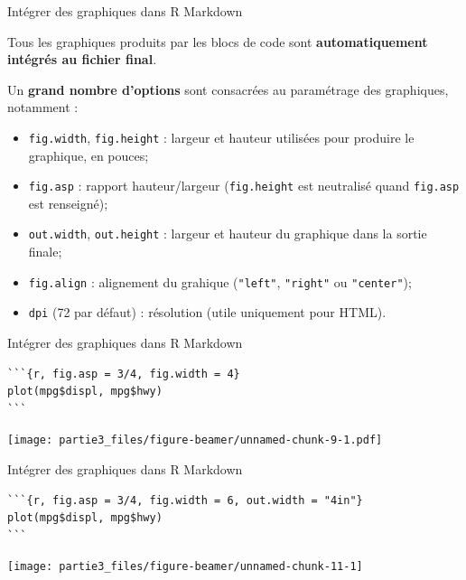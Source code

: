 \documentclass[12pt,ignorenonframetext,]{beamer}
\providecommand{\tightlist}{%
\setlength{\itemsep}{0pt}\setlength{\parskip}{0pt}}
\begin{document}
\begin{frame}[fragile]{Intégrer des graphiques dans R Markdown}

Tous les graphiques produits par les blocs de code sont
\textbf{automatiquement intégrés au fichier final}.

\pause Un \textbf{grand nombre d'options} sont consacrées au paramétrage
des graphiques, notamment :

\begin{itemize}
\tightlist
\item
  \texttt{fig.width}, \texttt{fig.height} : largeur et hauteur utilisées
  pour produire le graphique, en pouces;
\item
  \texttt{fig.asp} : rapport hauteur/largeur (\texttt{fig.height} est
  neutralisé quand \texttt{fig.asp} est renseigné);
\item
  \texttt{out.width}, \texttt{out.height} : largeur et hauteur du
  graphique dans la sortie finale;
\item
  \texttt{fig.align} : alignement du grahique (\texttt{"left"},
  \texttt{"right"} ou \texttt{"center"});
\item
  \texttt{dpi} (72 par défaut) : résolution (utile uniquement pour
  HTML).
\end{itemize}

\end{frame}

\begin{frame}[fragile]{Intégrer des graphiques dans R Markdown}

\footnotesize \center

\begin{verbatim}
```{r, fig.asp = 3/4, fig.width = 4}
plot(mpg$displ, mpg$hwy)
```
\end{verbatim}

\texttt{[image: partie3\_files/figure-beamer/unnamed-chunk-9-1.pdf]}

\end{frame}

\begin{frame}[fragile]{Intégrer des graphiques dans R Markdown}

\footnotesize \center

\begin{verbatim}
```{r, fig.asp = 3/4, fig.width = 6, out.width = "4in"}
plot(mpg$displ, mpg$hwy)
```
\end{verbatim}

\texttt{[image: partie3\_files/figure-beamer/unnamed-chunk-11-1]}

\end{frame}
\end{document}

